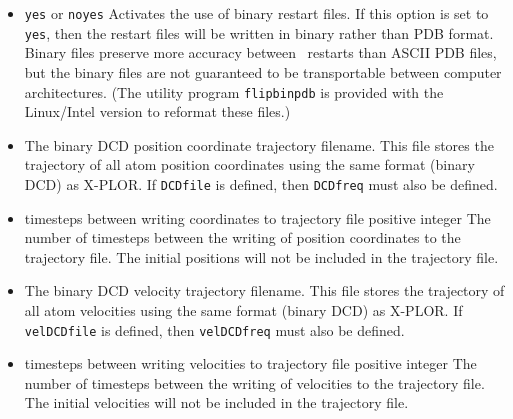 \begin{itemize}
\item
{}
{{\tt yes} or {\tt no}}{{\tt yes}}
{
Activates the use of binary restart files.  
If this option is set to {\tt yes}, then the restart files
will be written in binary rather than PDB format.  
Binary files preserve more accuracy between \NAMD\ restarts 
than ASCII PDB files, 
but the binary files are not guaranteed to be transportable 
between computer architectures.  
(The utility program {\tt flipbinpdb} is provided with the Linux/Intel
version to reformat these files.)
}

\item
{}
{
The binary DCD position coordinate trajectory filename.  
This file stores the trajectory of all atom position coordinates 
using the same format (binary DCD) as X-PLOR.  
If {\tt DCDfile} is defined, then {\tt DCDfreq} must also be defined.  
}

\item
{}
{timesteps between writing coordinates to trajectory file}
{positive integer}
{
The number of timesteps between the writing of position coordinates 
to the trajectory file.  
The initial positions will not be included in the trajectory file.
}

\item
{}
{
The binary DCD velocity trajectory filename.  
This file stores the trajectory of 
all atom velocities using the same format (binary DCD) as X-PLOR.  
If {\tt velDCDfile} is defined, then {\tt velDCDfreq} must also 
be defined.  
}

\item
{}
{timesteps between writing velocities to trajectory file}
{positive integer}
{
The number of timesteps between the writing of 
velocities to the trajectory file.  
The initial velocities will not be included in the trajectory file.
}


\end{itemize}
